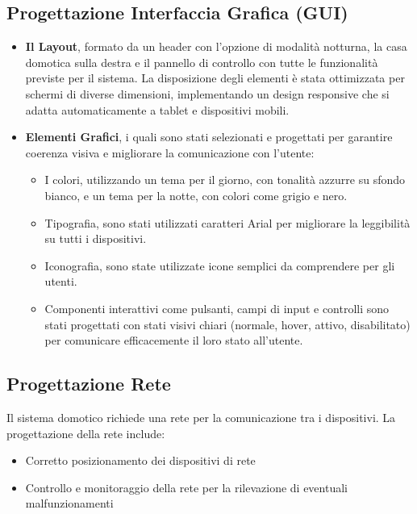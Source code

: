 \documentclass[a4paper,12pt]{article}
\begin{document}
\subsection{Progettazione Interfaccia Grafica (GUI)}
\begin{itemize}
    \item \textbf{Il Layout}, formato da un header con l'opzione di modalità notturna, la casa domotica sulla destra e il pannello di controllo con tutte le funzionalità previste per il sistema.
    La disposizione degli elementi è stata ottimizzata per schermi di diverse dimensioni, implementando un design responsive che si adatta automaticamente a tablet e dispositivi mobili.
    \item \textbf{Elementi Grafici}, i quali sono stati selezionati e progettati per garantire coerenza visiva e migliorare la comunicazione con l'utente:\begin{itemize}
        \item I colori, utilizzando un tema per il giorno, con tonalità azzurre su sfondo bianco, e un tema per la notte, con colori come grigio e nero.
        \item Tipografia, sono stati utilizzati caratteri Arial per migliorare la leggibilità su tutti i dispositivi.
        \item Iconografia, sono state utilizzate icone semplici da comprendere per gli utenti.
        \item Componenti interattivi come pulsanti, campi di input e controlli sono stati progettati con stati visivi chiari (normale, hover, attivo, disabilitato) per comunicare efficacemente il loro stato all'utente.
    \end{itemize}
\end{itemize}

\subsection{Progettazione Rete}
Il sistema domotico richiede una rete per la comunicazione tra i dispositivi. La progettazione della rete include:\begin{itemize}
    \item Corretto posizionamento dei dispositivi di rete
    \item Controllo e monitoraggio della rete per la rilevazione di eventuali malfunzionamenti
\end{itemize}
\end{document}

